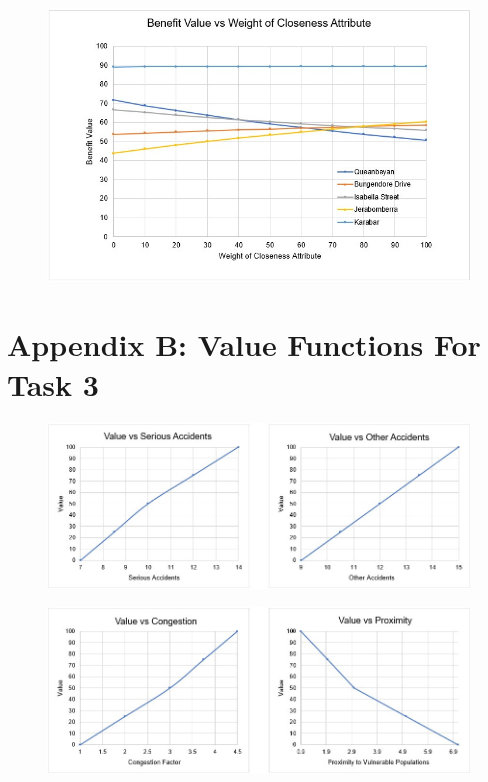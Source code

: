\documentclass[11pt, a4paper]{article}
\begin{document}
        \begin{figure}[!ht]
            \centering
            \includegraphics[width=\textwidth]{appendices/1c.jpg}
        \end{figure}

    \newpage
    \section*{Appendix B: Value Functions For Task 3}

        \begin{figure}[!ht]
            \centering
            \includegraphics[width=\textwidth]{appendices/2a.jpg}
        \end{figure}

        \begin{figure}[!ht]
            \centering
            \includegraphics[width=\textwidth]{appendices/2b.jpg}
        \end{figure}
\end{document}
